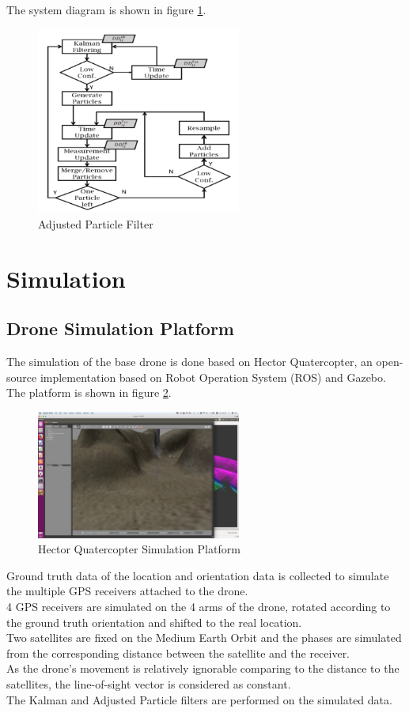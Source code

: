 \documentclass[journal,onecolumn]{IEEEtran}
\begin{document}
The system diagram is shown in figure \ref{APF}.
\begin{figure}
  \centering
  \captionsetup{justification=centering}
  \includegraphics[width=0.6\textwidth]{fig/APF.png}
  \caption{Adjusted Particle Filter}
  \label{APF}
\end{figure}
\section{Simulation}
\subsection{Drone Simulation Platform}
The simulation of the base drone is done based on Hector Quatercopter, an open-source
implementation based on Robot Operation System (ROS) and Gazebo.
The platform is shown in figure \ref{hector}.\\
\begin{figure}
  \centering
  \captionsetup{justification=centering}
  \includegraphics[width=0.6\textwidth]{fig/hector.png}
  \caption{Hector Quatercopter Simulation Platform}
  \label{hector}
\end{figure}
Ground truth data of the location and orientation data is collected to simulate the
multiple GPS receivers attached to the drone.\\
4 GPS receivers are simulated on the 4 arms of the drone, rotated according to
the ground truth orientation and shifted to the real location.\\
Two satellites are fixed on the Medium Earth Orbit and the phases are simulated
from the corresponding distance between the satellite and the receiver.\\
As the drone's movement is relatively ignorable comparing to the distance to the
satellites, the line-of-sight vector is considered as constant.\\
The Kalman and Adjusted Particle filters are performed on the simulated data.
\end{document}
